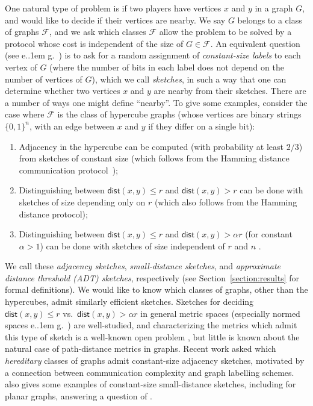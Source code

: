 \documentclass[11pt]{article}
\newcommand*\eg{e.\kern.1em g.\ }
\theoremstyle{definition}
\newcommand{\zo}{\{0,1\}}
\renewcommand{\leq}{\leqslant}
\def\F {{\mathcal F}}
\newcommand{\dist}{\mathsf{dist}}
\begin{document}
One natural type of problem is if two players have vertices $x$ and $y$ in a graph $G$, and would
like to decide if their vertices are nearby. We say $G$ belongs to a class of graphs $\F$, and we
ask which classes $\F$ allow the problem to be solved by a protocol whose cost is independent of the
size of $G \in \F$. An equivalent question (see \eg \cite{Har20, HWZ21}) is to ask for a random
assignment of \emph{constant-size labels} to each vertex of $G$ (where the number of bits in each
label does not depend on the number of vertices of $G$), which we call \emph{sketches}, in
such a way that one can determine whether two vertices $x$ and $y$ are nearby from their sketches. There are a
number of ways one might define ``nearby''\!\!. To give some examples, consider the case where
$\F$ is the class of hypercube graphs (whose vertices are binary strings $\zo^n$, with an edge
between $x$ and $y$ if they differ on a single bit):
\begin{enumerate}[itemsep=0em,leftmargin=1.75em]
\item Adjacency in the hypercube can be computed (with probability at least $2/3$) from sketches of
constant size (which follows from the Hamming distance communication protocol~\cite{HSZZ06});
\item Distinguishing between $\dist(x,y) \leq r$ and $\dist(x,y) > r$ can be done with
sketches of size depending only on $r$ (which also follows from the Hamming distance protocol);
\item Distinguishing between $\dist(x,y) \leq r$ and $\dist(x,y) > \alpha r$ (for constant
$\alpha > 1$) can be done with sketches of size independent of $r$ and $n$ \cite{KOR00}.
\end{enumerate}
\noindent
We call these \emph{adjacency sketches}, \emph{small-distance sketches}, and \emph{approximate
distance threshold (ADT) sketches}, respectively (see Section~\ref{section:results} for formal
definitions). We would like to know which classes of graphs, other than the hypercubes, admit
similarly efficient sketches.  Sketches for deciding $\dist(x,y) \leq r$ vs.~$\dist(x,y) > \alpha r$
in general metric spaces (especially normed spaces \eg \cite{Ind06,AKR18,KN19}) are well-studied,
and characterizing the metrics which admit this type of sketch is a well-known open problem
\cite{SS02,AK08,sublinear25,Raz17}, but little is known about the natural case of path-distance
metrics in graphs. Recent work \cite{HWZ21} asked which \emph{hereditary} classes of graphs admit
constant-size adjacency sketches, motivated by a connection between communication complexity and
graph labelling schemes. \cite{HWZ21} also gives some examples of constant-size small-distance
sketches, including for planar graphs, answering a question of \cite{Har20}.
\end{document}
